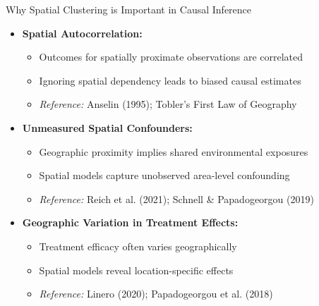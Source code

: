 \documentclass{beamer}
\begin{document}
\begin{frame}{Why Spatial Clustering is Important in Causal Inference}
\begin{itemize}
    \item \textbf{Spatial Autocorrelation:}
    \begin{itemize}
        \item Outcomes for spatially proximate observations are correlated
        \item Ignoring spatial dependency leads to biased causal estimates
        \item \textit{Reference:} Anselin (1995); Tobler's First Law of Geography
    \end{itemize}
    \item \textbf{Unmeasured Spatial Confounders:}
    \begin{itemize}
        \item Geographic proximity implies shared environmental exposures
        \item Spatial models capture unobserved area-level confounding
        \item \textit{Reference:} Reich et al. (2021); Schnell \& Papadogeorgou (2019)
    \end{itemize}
    \item \textbf{Geographic Variation in Treatment Effects:}
    \begin{itemize}
        \item Treatment efficacy often varies geographically
        \item Spatial models reveal location-specific effects
        \item \textit{Reference:} Linero (2020); Papadogeorgou et al. (2018)
    \end{itemize}
\end{itemize}
\end{frame}
\end{document}
